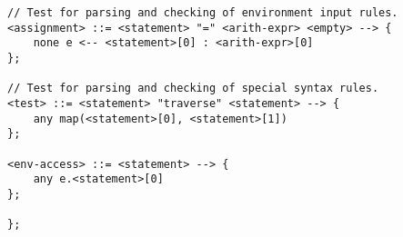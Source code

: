 \begin{verbatim}
// Test for parsing and checking of environment input rules. 
<assignment> ::= <statement> "=" <arith-expr> <empty> --> {
    none e <-- <statement>[0] : <arith-expr>[0]
};

// Test for parsing and checking of special syntax rules. 
<test> ::= <statement> "traverse" <statement> --> {
    any map(<statement>[0], <statement>[1])
};

<env-access> ::= <statement> --> {
    any e.<statement>[0]
};

};

\end{verbatim}

